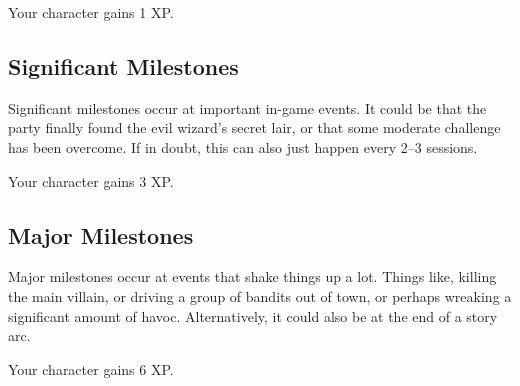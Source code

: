 Your character gains 1 XP.

\subsection{Significant Milestones}
Significant milestones occur at important in-game events.
It could be that the party finally found the evil wizard's secret lair, or that some moderate challenge has been overcome.
If in doubt, this can also just happen every 2--3 sessions.

Your character gains 3 XP.

\subsection{Major Milestones}
Major milestones occur at events that shake things up a lot.
Things like, killing the main villain, or driving a group of bandits out of town, or perhaps wreaking a significant amount of havoc.
Alternatively, it could also be at the end of a story arc.

Your character gains 6 XP.
